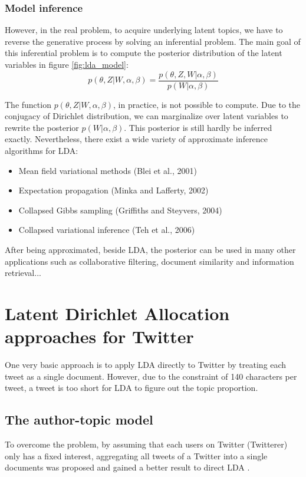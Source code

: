\documentclass[conference,compsoc]{IEEEtran}
\begin{document}
\subsubsection{Model inference}
However, in the real problem, to acquire underlying latent topics, we have to reverse the generative process by solving an inferential problem. The main goal of this inferential problem is to compute the posterior distribution of the latent variables in figure \ref{fig:lda_model}:
\[p(\theta,Z|W,\alpha,\beta)=\frac{p(\theta,Z,W|\alpha,\beta)}{p(W|\alpha,\beta)}\]

The function $p(\theta,Z|W,\alpha,\beta)$, in practice, is not possible to compute. Due to the conjugacy of Dirichlet distribution, we can marginalize over latent variables to rewrite the posterior $p(W|\alpha,\beta)$. This posterior is still hardly be inferred exactly. Nevertheless, there exist a wide variety of approximate inference algorithms for LDA:
\begin{itemize}
	\item Mean field variational methods \cite{blei2004variational} (Blei et al., 2001)
	\item Expectation propagation \cite{minka2002expectation} (Minka and Lafferty, 2002)
	\item Collapsed Gibbs sampling \cite{griffiths2004finding} (Griffiths and Steyvers, 2004)
	\item Collapsed variational inference \cite{teh2006collapsed} (Teh et al., 2006)
\end{itemize}

After being approximated, beside LDA, the posterior can be used in many other applications such as collaborative filtering, document similarity and information retrieval...

\section{Latent Dirichlet Allocation approaches for Twitter}

One very basic approach is to apply LDA directly to Twitter by treating each tweet as a single document. However, due to the constraint of 140 characters per tweet, a tweet is too short for LDA to figure out the topic proportion.

\subsection{The author-topic model}

To overcome the problem, by assuming that each users on Twitter (Twitterer) only has a fixed interest, aggregating all tweets of a Twitter into a single documents was proposed and gained a better result to direct LDA \cite{Weng2010,hong2010empirical}.
\end{document}
